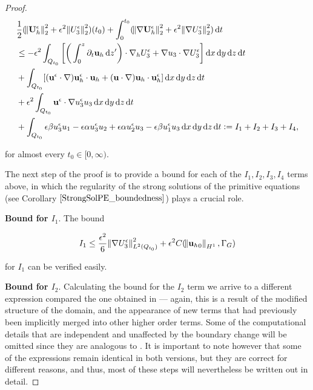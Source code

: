 \documentclass[11pt]{article}
\newcommand*\diff{\mathop{}\!\mathrm{d}}
\begin{document}
\begin{proof}
  \begin{equation} \label{introduce_I_terms}
    \begin{split}
      & \frac{1}{2} (\norm{\mathbf{U}_h^\epsilon}_2^2 + \epsilon^2 \norm{U_3^\epsilon}_2^2) (t_0) + \int_0^{t_0} (\norm{\nabla \mathbf{U}_h^\epsilon}_2^2 + \epsilon^2 \norm{\nabla U_3^\epsilon}_2^2) \diff t  \\
      & \leq - \epsilon^2 \int_{Q_{t_0}} \bigg [ \bigg ( \int_0^z \partial_t \mathbf{u}_h \diff z' \bigg ) \cdot \nabla_h U_3^\epsilon + \nabla u_3 \cdot \nabla U_3^\epsilon \bigg ] \diff x \diff y \diff z \diff t \\
      & + \int_{Q_{t_0}} [(\mathbf{u}^\epsilon \cdot \nabla) \mathbf{u}_h^\epsilon \cdot \mathbf{u}_h + (\mathbf{u} \cdot \nabla )\mathbf{u}_h \cdot \mathbf{u}_h^\epsilon] \diff x \diff y \diff z \diff t \\
      & + \epsilon^2 \int_{Q_{t_0}} \mathbf{u}^\epsilon \cdot \nabla u_3^\epsilon u_3 \diff x \diff y \diff z \diff t \\
      & + \int_{Q_{t_0}}  \epsilon \beta u_3^\epsilon u_1 - \epsilon \alpha u_3^\epsilon u_2 + \epsilon \alpha u_2^\epsilon u_3 - \epsilon \beta u_1^\epsilon u_3 \diff x \diff y \diff z \diff t := I_1 + I_2 + I_3 + I_4, \raisetag{80pt}
    \end{split}
  \end{equation}
  
  for almost every $t_0 \in [0, \infty).$
  
  The next step of the proof is to provide a bound for each of the $I_1, I_2, I_3, I_4$ terms above, in which the regularity of the strong solutions of the primitive equations (see Corollary $\ref{StrongSolPE_boundedness}$) plays a crucial role.
  
  \textbf{Bound for $I_1.$} The bound
  
  $$ I_1 \leq \frac{\epsilon^2}{6} \norm{\nabla U_3^\epsilon}^2_{L^2(Q_{t_0})} + \epsilon^2 C(\norm{{\mathbf{u}_h}_0}_{H^1}, \Gamma_G) $$
  
  for $I_1$ can be verified easily.
  
  \textbf{Bound for $I_2.$} Calculating the bound for the $I_2$ term we arrive to a different expression compared the one obtained in \cite{li2019primitive} --- again, this is a result of the modified structure of the domain, and the appearance of new terms that had previously been implicitly merged into other higher order terms. Some of the computational details that are independent and unaffected by the boundary change will be omitted since they are analogous to \cite{li2019primitive}. It is important to note however that some of the expressions remain identical in both versions, but they are correct for different reasons, and thus, most of these steps will nevertheless be written out in detail.
  

\end{proof}
\end{document}
